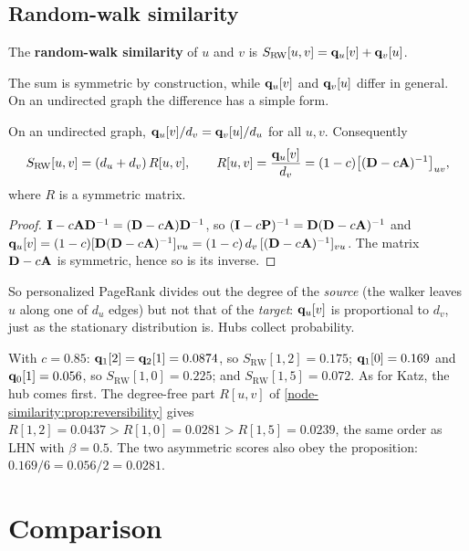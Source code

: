 \begin{notechapter}
\subsection{Random-walk similarity}

\begin{definition}\label{node-similarity:def:rw-sim}
The \textbf{random-walk similarity} of $u$ and $v$ is $S_{\text{RW}}[u,v] = \mathbf{q}_u[v] + \mathbf{q}_v[u]$.
\end{definition}

The sum is symmetric by construction, while $\mathbf{q}_u[v]$ and $\mathbf{q}_v[u]$ differ in general. On an undirected graph the difference has a simple form.

\begin{proposition}[Reversibility]\label{node-similarity:prop:reversibility}
On an undirected graph, $\mathbf{q}_u[v]/d_v = \mathbf{q}_v[u]/d_u$ for all $u, v$. Consequently
\[
S_{\text{RW}}[u,v] = (d_u + d_v)\,R[u,v], \qquad R[u,v] = \frac{\mathbf{q}_u[v]}{d_v} = (1-c)\bigl[(\mathbf{D} - c\mathbf{A})^{-1}\bigr]_{uv},
\]
where $R$ is a symmetric matrix.
\end{proposition}

\begin{proof}
$\mathbf{I} - c\mathbf{A}\mathbf{D}^{-1} = (\mathbf{D} - c\mathbf{A})\mathbf{D}^{-1}$, so $(\mathbf{I} - c\mathbf{P})^{-1} = \mathbf{D}(\mathbf{D} - c\mathbf{A})^{-1}$ and $\mathbf{q}_u[v] = (1-c)[\mathbf{D}(\mathbf{D} - c\mathbf{A})^{-1}]_{vu} = (1-c)\,d_v\,[(\mathbf{D} - c\mathbf{A})^{-1}]_{vu}$. The matrix $\mathbf{D} - c\mathbf{A}$ is symmetric, hence so is its inverse.
\end{proof}

So personalized PageRank divides out the degree of the \emph{source} (the walker leaves $u$ along one of $d_u$ edges) but not that of the \emph{target}: $\mathbf{q}_u[v]$ is proportional to $d_v$, just as the stationary distribution is. Hubs collect probability.

\begin{example}
With $c = 0.85$: $\mathbf{q}_1[2] = \mathbf{q}_2[1] = 0.0874$, so $S_{\text{RW}}[1,2] = 0.175$; $\mathbf{q}_1[0] = 0.169$ and $\mathbf{q}_0[1] = 0.056$, so $S_{\text{RW}}[1,0] = 0.225$; and $S_{\text{RW}}[1,5] = 0.072$. As for Katz, the hub comes first. The degree-free part $R[u,v]$ of \cref{node-similarity:prop:reversibility} gives $R[1,2] = 0.0437 > R[1,0] = 0.0281 > R[1,5] = 0.0239$, the same order as LHN with $\beta = 0.5$. The two asymmetric scores also obey the proposition: $0.169/6 = 0.056/2 = 0.0281$.
\end{example}

\section{Comparison}


\end{notechapter}

